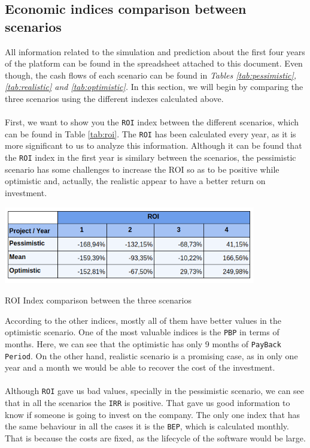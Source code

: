 \documentclass[./main.tex]{subfiles}
\begin{document}
\subsection{Economic indices comparison between scenarios}
All information related to the simulation and prediction about the first four years of the platform can be found in the spreadsheet attached to this document. Even though, the cash flows of each scenario can be found in \textit{Tables \ref{tab:pessimistic}, \ref{tab:realistic} and \ref{tab:optimistic}.}
In this section, we will begin by comparing the three scenarios using the different indexes calculated above. \\
\\
First, we want to show you the \texttt{ROI} index between the different scenarios, which can be found in Table \ref{tab:roi}. The \texttt{ROI} has been calculated every year, as it is more significant to us to analyze this information. Although it can be found that the \texttt{ROI} index in the first year is similary between the scenarios, the pessimistic scenario has some challenges to increase the ROI so as to be positive while optimistic and, actually, the realistic appear to have a better return on investment.
\begin{table}[H]
	\centering
	\includegraphics[width=11cm]{roi.png}
	\caption{ROI Index comparison between the three scenarios}
	\label{tab:roi}
\end{table}
According to the other indices, mostly all of them have better values in the optimistic scenario. One of the most valuable indices is the \texttt{PBP} in terms of months. Here, we can see that the optimistic has only 9 months of \texttt{PayBack Period}. On the other hand, realistic scenario is a promising case, as in only one year and a month we would be able to recover the cost of the investment.
\\
\\
Although \texttt{ROI} gave us bad values, specially in the pessimistic scenario, we can see that in all the scenarios the \texttt{IRR} is positive. That gave us good information to know if someone is going to invest on the company. The only one index that has the same behaviour in all the cases it is the \texttt{BEP}, which is calculated monthly. That is because the costs are fixed, as the lifecycle of the software would be large.
\end{document}
